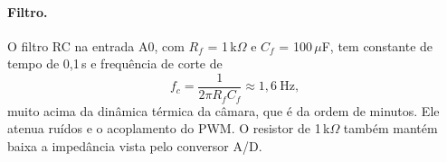 \paragraph{Filtro.} O filtro RC na entrada A0, com $R_f$ = 1\,k$\Omega$ e $C_f$ = 100\,$\mu$F, tem constante de tempo de 0,1\,s e frequência de corte de
\begin{equation}
  f_c = \frac{1}{2\pi R_f C_f} \approx 1{,}6\ \text{Hz},
\end{equation}
muito acima da dinâmica térmica da câmara, que é da ordem de minutos. Ele atenua ruídos e o acoplamento do PWM. O resistor de 1\,k$\Omega$ também mantém baixa a impedância vista pelo conversor A/D.
